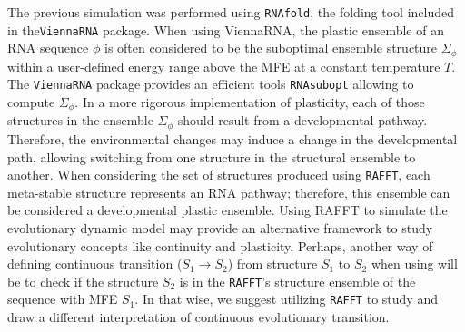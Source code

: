 
The previous simulation was performed using \texttt{RNAfold}, the folding tool included in the\texttt{ViennaRNA} package. When using ViennaRNA, the plastic ensemble of an RNA sequence $\phi$ is often considered to be the suboptimal ensemble structure $\Sigma_{\phi}$ within a user-defined energy range above the MFE  at a constant temperature $T$. The \texttt{ViennaRNA} package provides an efficient tools \texttt{RNAsubopt} allowing to compute $\Sigma_{\phi}$.  In a more rigorous implementation of plasticity, each of those structures in the ensemble $\Sigma_{\phi}$ should result from a developmental pathway. Therefore, the environmental changes may induce a change in the developmental path, allowing switching from one structure in the structural ensemble to another. When considering the set of structures produced using \texttt{RAFFT}, each meta-stable structure represents an RNA pathway; therefore, this ensemble can be considered a developmental plastic ensemble. Using RAFFT to simulate the evolutionary dynamic model may provide an alternative framework to study evolutionary concepts like continuity and plasticity. Perhaps, another way of defining continuous transition ($S_1\rightarrow S_2$) from structure $S_1$ to $S_2$ when using will be to check if the structure $S_2$ is in the \texttt{RAFFT}'s structure ensemble of the sequence with MFE $S_1$. In that wise, we suggest utilizing \texttt{RAFFT} to study and draw a different interpretation of continuous evolutionary transition.


